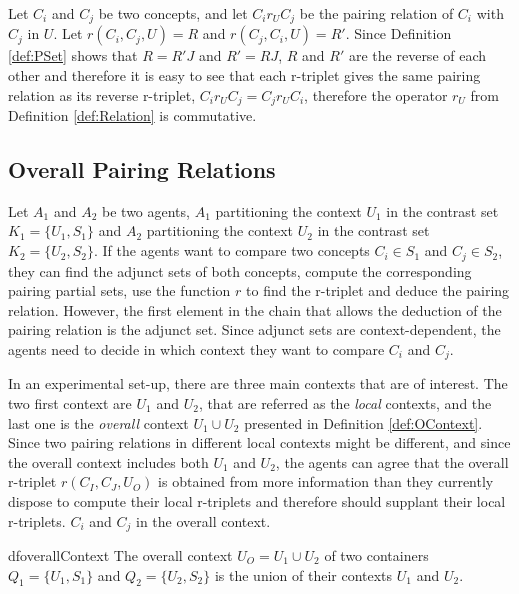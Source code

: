 Let $C_{i}$ and $C_{j}$ be two concepts, and let $C_{i} r_{U} C_{j}$ be the pairing relation of $C_{i}$ with $C_{j}$ in $U$. Let $r(C_{i},C_{j}, U) = R$ and $r(C_{j}, C_{i}, U) = R'$. Since Definition \ref{def:PSet} shows that $R = R'J$ and $R' = RJ$, $R$ and $R'$ are the reverse of each other and therefore it is easy to see that each r-triplet gives the same pairing relation as its reverse r-triplet, $C_{i} r_{U} C_{j} = C_{j} r_{U} C_{i}$, therefore the operator $r_{U}$ from Definition \ref{def:Relation} is commutative.


\subsection{Overall Pairing Relations}\label{sec:Overall}

Let $A_{1}$ and $A_{2}$ be two agents, $A_{1}$ partitioning the context $U_{1}$ in the contrast set $K_{1} = \{ U_{1}, S_{1} \}$ and $A_{2}$ partitioning the context $U_{2}$ in the contrast set $K_{2} = \{ U_{2}, S_{2}\}$. If the agents want to compare two concepts $C_{i} \in S_{1}$ and $C_{j} \in S_{2}$, they can find the adjunct sets of both concepts, compute the corresponding pairing partial sets, use the function $r$ to find the r-triplet and deduce the pairing relation. However, the first element in the chain that allows the deduction of the pairing relation is the adjunct set. Since adjunct sets are context-dependent, the agents need to decide in which context they want to compare $C_{i}$ and $C_{j}$.

In an experimental set-up, there are three main contexts that are of interest. The two first context are $U_{1}$ and $U_{2}$, that are referred as the \emph{local} contexts, and the last one is the \emph{overall} context $U_{1} \cup U_{2}$ presented in Definition \ref{def:OContext}. Since two pairing relations in different local contexts might be different, and since the overall context includes both $U_{1}$ and $U_{2}$, the agents can agree that the overall r-triplet $r(C_{I},C_{J},U_{O})$ is obtained from more information than they currently dispose to compute their local r-triplets and therefore should supplant their local r-triplets. $C_{i}$ and $C_{j}$ in the overall context.

\begin{restatable}{df}{overallContext}
\label{def:OContext}
The overall context $U_O = U_1 \cup U_2$ of two containers $Q_{1} = \{U_{1}, S_{1}\}$ and $Q_{2} = \{U_{2}, S_{2}\}$ is the union of their contexts $U_1$ and $U_2$.
\end{restatable}

